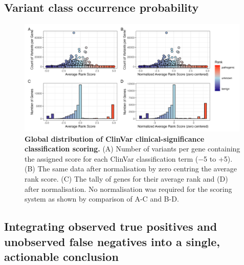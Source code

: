 \subsection{Variant class occurrence probability}
\begin{figure}[ht]
  \centering
  \includegraphics[width=0.99\textwidth]{../images/p_gene_summary_hist_patch3.png}
\caption{\textbf{Global distribution of ClinVar clinical-significance classification scoring.} 
(A) Number of variants per gene containing the assigned score for each ClinVar classification term (−5 to +5). 
(B) The same data after normalisation by zero centring the average rank score.
(C) The tally of genes for their average rank and (D) after normalisation. No normalisation was required for the scoring system as shown by comparison of A-C and B-D.}
  \label{fig:p_gene_summary_hist_patch3}
\end{figure}

\clearpage
\subsection{Integrating observed true positives and unobserved false negatives into a single, actionable conclusion}







